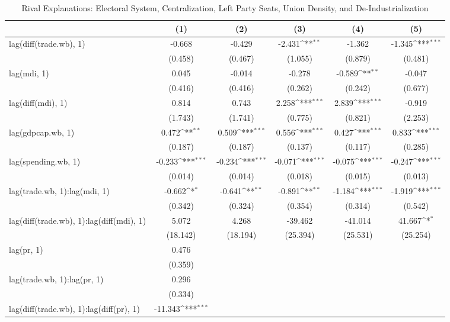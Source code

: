 \def\sym#1{\ifmmode^{#1}\else\(^{#1}\)\fi}
\begin{table}[htbp]
\footnotesize
\centering
\caption{Rival Explanations: Electoral System, Centralization, Left Party Seats, Union Density, and De-Industrialization}
\begin{tabular}{l*{5}{c}}
\hline\hline
  &\multicolumn{1}{c}{(1)} &\multicolumn{1}{c}{(2)} &\multicolumn{1}{c}{(3)} &\multicolumn{1}{c}{(4)} &\multicolumn{1}{c}{(5)} \\
\hline
lag(diff(trade.wb), 1) 		&-0.668 		&-0.429 		&-2.431\sym{**} 		&-1.362 		&-1.345\sym{***} \\
  		&(0.458) 		&(0.467) 		&(1.055) 		&(0.879) 		&(0.481) \\
lag(mdi, 1) 		&0.045 		&-0.014 		&-0.278 		&-0.589\sym{**} 		&-0.047 \\
  		&(0.416) 		&(0.416) 		&(0.262) 		&(0.242) 		&(0.677) \\
lag(diff(mdi), 1) 		&0.814 		&0.743 		&2.258\sym{***} 		&2.839\sym{***} 		&-0.919 \\
  		&(1.743) 		&(1.741) 		&(0.775) 		&(0.821) 		&(2.253) \\
lag(gdpcap.wb, 1) 		&0.472\sym{**} 		&0.509\sym{***} 		&0.556\sym{***} 		&0.427\sym{***} 		&0.833\sym{***} \\
  		&(0.187) 		&(0.187) 		&(0.137) 		&(0.117) 		&(0.285) \\
lag(spending.wb, 1) 		&-0.233\sym{***} 		&-0.234\sym{***} 		&-0.071\sym{***} 		&-0.075\sym{***} 		&-0.247\sym{***} \\
  		&(0.014) 		&(0.014) 		&(0.018) 		&(0.015) 		&(0.013) \\
lag(trade.wb, 1):lag(mdi, 1) 		&-0.662\sym{*} 		&-0.641\sym{**} 		&-0.891\sym{**} 		&-1.184\sym{***} 		&-1.919\sym{***} \\
  		&(0.342) 		&(0.324) 		&(0.354) 		&(0.314) 		&(0.542) \\
lag(diff(trade.wb), 1):lag(diff(mdi), 1) 		&5.072 		&4.268 		&-39.462 		&-41.014 		&41.667\sym{*} \\
  		&(18.142) 		&(18.194) 		&(25.394) 		&(25.531) 		&(25.254) \\
lag(pr, 1) 		&0.476 		& 		& 		& 		& \\
  		&(0.359) 		& 		& 		& 		& \\
lag(trade.wb, 1):lag(pr, 1) 		&0.296 		& 		& 		& 		& \\
  		&(0.334) 		& 		& 		& 		& \\
lag(diff(trade.wb), 1):lag(diff(pr), 1) 		&-11.343\sym{***} 		& 		& 		& 		& \\

\end{tabular}
\end{table}
